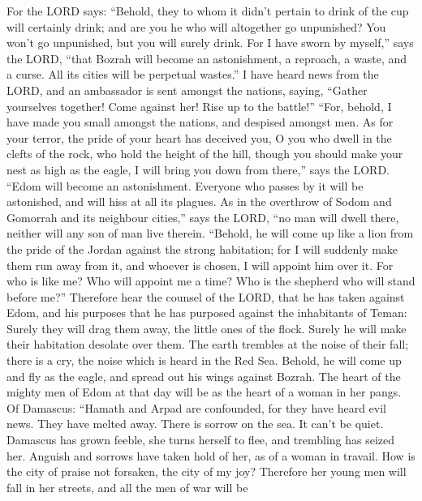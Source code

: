  For the LORD says: ``Behold, they to whom it didn't
pertain to drink of the cup will certainly drink; and are you he who
will altogether go unpunished? You won't go unpunished, but you will
surely drink.  For I have sworn by myself,'' says the
LORD, ``that Bozrah will become an astonishment, a reproach, a waste,
and a curse. All its cities will be perpetual wastes.'' 
I have heard news from the LORD, and an ambassador is sent amongst the
nations, saying, ``Gather yourselves together! Come against her! Rise up
to the battle!''  ``For, behold, I have made you small
amongst the nations, and despised amongst men.  As for
your terror, the pride of your heart has deceived you, O you who dwell
in the clefts of the rock, who hold the height of the hill, though you
should make your nest as high as the eagle, I will bring you down from
there,'' says the LORD.  ``Edom will become an
astonishment. Everyone who passes by it will be astonished, and will
hiss at all its plagues.  As in the overthrow of Sodom
and Gomorrah and its neighbour cities,'' says the LORD, ``no man will
dwell there, neither will any son of man live therein. 
``Behold, he will come up like a lion from the pride of the Jordan
against the strong habitation; for I will suddenly make them run away
from it, and whoever is chosen, I will appoint him over it. For who is
like me? Who will appoint me a time? Who is the shepherd who will stand
before me?''  Therefore hear the counsel of the LORD,
that he has taken against Edom, and his purposes that he has purposed
against the inhabitants of Teman: Surely they will drag them away, the
little ones of the flock. Surely he will make their habitation desolate
over them.  The earth trembles at the noise of their
fall; there is a cry, the noise which is heard in the Red Sea.
 Behold, he will come up and fly as the eagle, and spread
out his wings against Bozrah. The heart of the mighty men of Edom at
that day will be as the heart of a woman in her pangs. 
Of Damascus: ``Hamath and Arpad are confounded, for they have heard evil
news. They have melted away. There is sorrow on the sea. It can't be
quiet.  Damascus has grown feeble, she turns herself to
flee, and trembling has seized her. Anguish and sorrows have taken hold
of her, as of a woman in travail.  How is the city of
praise not forsaken, the city of my joy?  Therefore her
young men will fall in her streets, and all the men of war will be
